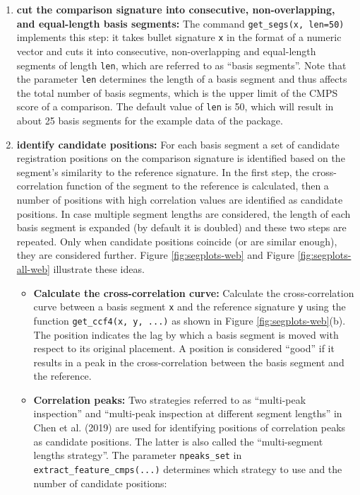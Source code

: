 \begin{enumerate}
\def\labelenumi{\arabic{enumi}.}
\item
  \textbf{cut the comparison signature into consecutive, non-overlapping, and equal-length basis segments:} The command \texttt{get\_segs(x,\ len=50)} implements this step: it takes bullet signature \texttt{x} in the format of a numeric vector and cuts it into consecutive, non-overlapping and equal-length segments of length \texttt{len}, which are referred to as ``basis segments''. Note that the parameter \texttt{len} determines the length of a basis segment and thus affects the total number of basis segments, which is the upper limit of the CMPS score of a comparison. The default value of \texttt{len} is 50, which will result in about 25 basis segments for the example data of the package.
\item
  \textbf{identify candidate positions:} For each basis segment a set of candidate registration positions on the comparison signature is identified based on the segment's similarity to the reference signature.
  In the first step, the cross-correlation function of the segment to the reference is calculated, then a number of positions with high correlation values are identified as candidate positions.
  In case multiple segment lengths are considered, the length of each basis segment is expanded (by default it is doubled) and these two steps are repeated.
  Only when candidate positions coincide (or are similar enough), they are considered further.
  Figure \ref{fig:segplots-web} and Figure \ref{fig:segplots-all-web} illustrate these ideas.

  \begin{itemize}
  \item
    \textbf{Calculate the cross-correlation curve:} Calculate the cross-correlation curve between a basis segment \texttt{x} and the reference signature \texttt{y} using the function \texttt{get\_ccf4(x,\ y,\ ...)} as shown in Figure \ref{fig:segplots-web}(b). The position indicates the lag by which a basis segment is moved with respect to its original placement. A position is considered ``good'' if it results in a peak in the cross-correlation between the basis segment and the reference.
  \item
    \textbf{Correlation peaks:} Two strategies referred to as ``multi-peak inspection'' and ``multi-peak inspection at different segment lengths'' in Chen et al. (2019) are used for identifying positions of correlation peaks as candidate positions. The latter is also called the ``multi-segment lengths strategy''. The parameter \texttt{npeaks\_set} in \texttt{extract\_feature\_cmps(...)} determines which strategy to use and the number of candidate positions:


\end{itemize}
\end{enumerate}
